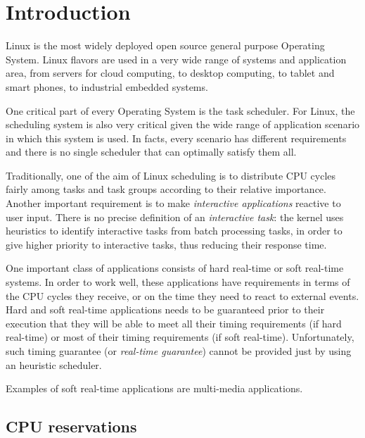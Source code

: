 \chapter{Introduction\label{chap:introduction}}


Linux is the most widely deployed open source general purpose
Operating System. Linux flavors are used in a very wide range of
systems and application area, from servers for cloud computing, to
desktop computing, to tablet and smart phones, to industrial embedded
systems. 

One critical part of every Operating System is the task scheduler. For
Linux, the scheduling system is also very critical given the wide
range of application scenario in which this system is used. In facts,
every scenario has different requirements and there is no single
scheduler that can optimally satisfy them all.

Traditionally, one of the aim of Linux scheduling is to distribute CPU
cycles fairly among tasks and task groups according to their relative
importance. Another important requirement is to make \emph{interactive
  applications} reactive to user input. There is no precise definition
of an \emph{interactive task}: the kernel uses heuristics to identify
interactive tasks from batch processing tasks, in order to give higher
priority to interactive tasks, thus reducing their response time.

One important class of applications consists of hard real-time or soft
real-time systems. In order to work well, these applications have
requirements in terms of the CPU cycles they receive, or on the time
they need to react to external events. Hard and soft real-time
applications needs to be guaranteed prior to their execution that they
will be able to meet all their timing requirements (if hard real-time)
or most of their timing requirements (if soft real-time).
Unfortunately, such timing guarantee (or \emph{real-time guarantee})
cannot be provided just by using an heuristic scheduler. 

Examples of soft real-time applications are multi-media applications. 
%
%

\section{CPU reservations}
 

